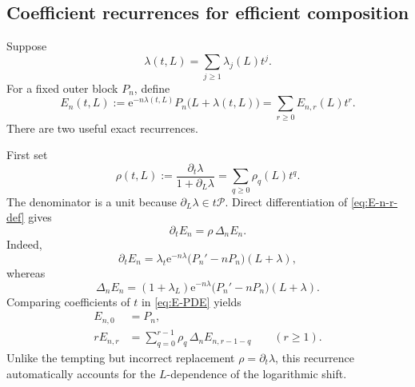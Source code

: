 \documentclass[11pt]{article}
\theoremstyle{pltheorem}
\newcommand{\PL}{\mathscr P}
\newcommand{\e}{\mathrm e}
\begin{document}
\subsection{Coefficient recurrences for efficient composition}

Suppose
\begin{equation}\label{eq:lambda-coefficients}
 \lambda(t,L)=\sum_{j\ge1}\lambda_j(L)t^j.
\end{equation}
For a fixed outer block \(P_n\), define
\begin{equation}\label{eq:E-n-r-def}
 E_n(t,L):=\e^{-n\lambda(t,L)}P_n\bigl(L+\lambda(t,L)\bigr)
 =\sum_{r\ge0}E_{n,r}(L)t^r.
\end{equation}
There are two useful exact recurrences.

First set
\begin{equation}\label{eq:rho-composition}
 \rho(t,L):=\frac{\partial_t\lambda}{1+\partial_L\lambda}
 =\sum_{q\ge0}\rho_q(L)t^q.
\end{equation}
The denominator is a unit because \(\partial_L\lambda\in t\PL\).  Direct
differentiation of \cref{eq:E-n-r-def} gives
\begin{equation}\label{eq:E-PDE}
 \partial_tE_n=\rho\,\Delta_nE_n.
\end{equation}
Indeed,
\[
 \partial_tE_n=\lambda_t\e^{-n\lambda}
 \bigl(P_n'-nP_n\bigr)(L+\lambda),
\]
whereas
\[
 \Delta_nE_n=(1+\lambda_L)\e^{-n\lambda}
 \bigl(P_n'-nP_n\bigr)(L+\lambda).
\]
Comparing coefficients of \(t\) in \cref{eq:E-PDE} yields
\begin{align}
 E_{n,0}&=P_n,\label{eq:E-rec-0}\\
 rE_{n,r}&=\sum_{q=0}^{r-1}\rho_q\,\Delta_nE_{n,r-1-q}
 \qquad(r\ge1).\label{eq:E-rec-r}
\end{align}
Unlike the tempting but incorrect replacement
\(\rho=\partial_t\lambda\), this recurrence automatically accounts for
the \(L\)-dependence of the logarithmic shift.
\end{document}

